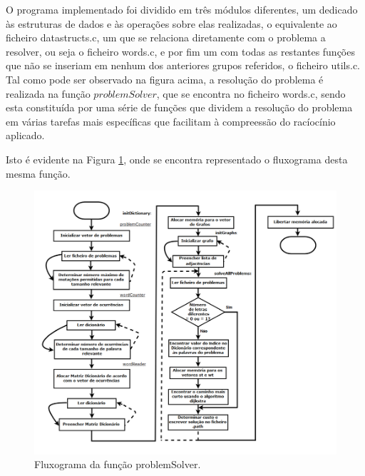 \documentclass[a4paper, 11pt]{article}
\begin{document}
   
     \par O programa implementado foi dividido em três módulos diferentes, um dedicado às estruturas de dados e às operações sobre elas realizadas, o equivalente ao ficheiro datastructs.c, um que se relaciona diretamente com o problema a resolver, ou seja o ficheiro words.c, e por fim um com todas as restantes funções que não se inseriam em nenhum dos anteriores grupos referidos, o ficheiro utils.c. 
      Tal como pode ser observado na figura acima, a resolução do problema é realizada na função $problemSolver$, que se encontra no ficheiro words.c, sendo esta constituída por uma série de funções que dividem a resolução do problema em várias tarefas mais específicas que facilitam à compreessão do racíocínio aplicado. 
      \par Isto é evidente na Figura \ref{fig:flux2}, onde se encontra representado o fluxograma desta mesma função.
   
    \begin{figure}
        \includegraphics[width=\linewidth]{fluxograma1.png}
        \caption{Fluxograma da função problemSolver.}
        \label{fig:flux2}
    \end{figure}
    
\end{document}
